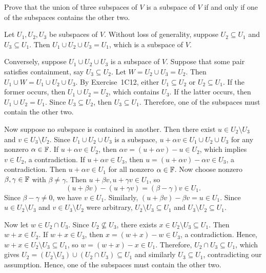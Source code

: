 \begin{exc}
\begin{exercise}
Prove that the union of three subspaces of $V$ is a subspace of $V$ if and only
if one of the subspaces contains the other two.
\end{exercise}
\begin{solution}
Let $U_1,U_2,U_3$ be subspaces of $V$. Without loss of generality, suppose
$U_2\subseteq U_1$ and $U_3\subseteq U_1$. Then $U_1\cup U_2\cup U_3=U_1$,
which is a subspace of $V$.

Conversely, suppose $U_1\cup U_2\cup U_3$ is a subspace of $V$. Suppose that
some pair satisfies containment, say $U_3\subseteq U_2$. Let
$W=U_2\cup U_3=U_2$. Then $U_1\cup W=U_1\cup U_2\cup U_3$. By Exercise~1C12,
either $U_1\subseteq U_2$ or $U_2\subseteq U_1$. If the former occurs, then
$U_1\cup U_2=U_2$, which contains $U_3$. If the latter occurs, then
$U_1\cup U_2=U_1$. Since $U_3\subseteq U_2$, then $U_3\subseteq U_1$.
Therefore, one of the subspaces must contain the other two.

Now suppose no subspace is contained in another. Then there exist
$u\in U_2\setminus U_3$ and $v\in U_3\setminus U_2$. Since
$U_1\cup U_2\cup U_3$ is a subspace, $u+\alpha v\in U_1\cup U_2\cup U_3$ for
any nonzero $\alpha\in\mathbb{F}$. If $u+\alpha v\in U_2$, then
$\alpha v=(u+\alpha v)-u\in U_2$, which implies $v\in U_2$, a contradiction. If
$u+\alpha v\in U_3$, then $u=(u+\alpha v)-\alpha v\in U_3$, a contradiction.
Then $u+\alpha v\in U_1$ for all nonzero $\alpha\in\mathbb{F}$. Now choose nonzero
$\beta,\gamma\in\mathbb{F}$ with $\beta\ne\gamma$. Then
$u+\beta v,u+\gamma v\in U_1$, so
\[ (u+\beta v)-(u+\gamma v) = (\beta-\gamma)v\in U_1. \]
Since $\beta-\gamma\ne0$, we have $v\in U_1$. Similarly,
$(u+\beta v)-\beta v=u\in U_1$. Since $u\in U_2\setminus U_3$ and
$v\in U_3\setminus U_2$ were arbitrary, $U_2\setminus U_3\subseteq U_1$ and
$U_3\setminus U_2\subseteq U_1$.

Now let $w\in U_2\cap U_3$. Since $U_2\nsubseteq U_3$, there exists
$x\in U_2\setminus U_3\subseteq U_1$. Then $w+x\in U_2$. If $w+x\in U_3$, then
$x=(w+x)-w\in U_3$, a contradiction. Hence,
$w+x\in U_2\setminus U_3\subseteq U_1$, so $w=(w+x)-x\in U_1$. Therefore,
$U_2\cap U_3\subseteq U_1$, which gives
$U_2=(U_2\setminus U_3)\cup(U_2\cap U_3)\subseteq U_1$ and similarly
$U_3\subseteq U_1$, contradicting our assumption. Hence, one of the subspaces
must contain the other two.


\end{solution}
\end{exc}
